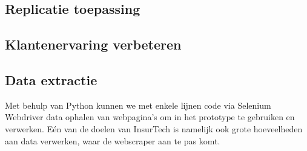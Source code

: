\subsection{Replicatie toepassing}

\subsection{Klantenervaring verbeteren}


\subsection{Data extractie}
Met behulp van Python kunnen we met enkele lijnen code via Selenium Webdriver data ophalen van webpagina's om in het prototype te gebruiken en verwerken.
Eén van de doelen van InsurTech is namelijk ook grote hoeveelheden aan data verwerken, waar de webscraper aan te pas komt.


